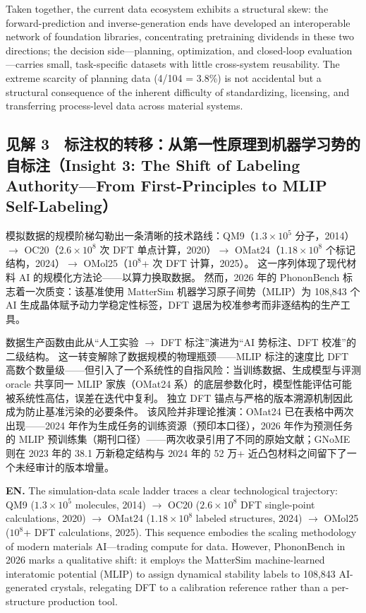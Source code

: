 \documentclass[11pt,a4paper]{ctexart}
\begin{document}
Taken together, the current data ecosystem exhibits a structural skew: the forward-prediction and inverse-generation ends have developed an interoperable network of foundation libraries, concentrating pretraining dividends in these two directions; the decision side---planning, optimization, and closed-loop evaluation---carries small, task-specific datasets with little cross-system reusability. The extreme scarcity of planning data (4/104 = 3.8\%) is not accidental but a structural consequence of the inherent difficulty of standardizing, licensing, and transferring process-level data across material systems.

\subsection*{见解 3　标注权的转移：从第一性原理到机器学习势的自标注（Insight 3: The Shift of Labeling Authority---From First-Principles to MLIP Self-Labeling）}

模拟数据的规模阶梯勾勒出一条清晰的技术路线：QM9（$1.3\times10^5$ 分子，2014）$\to$ OC20（$2.6\times10^8$ 次 DFT 单点计算，2020）$\to$ OMat24（$1.18\times10^8$ 个标记结构，2024）$\to$ OMol25（$10^8$+ 次 DFT 计算，2025）。
这一序列体现了现代材料 AI 的规模化方法论——以算力换取数据。
然而，2026 年的 PhononBench 标志着一次质变：该基准使用 MatterSim 机器学习原子间势（MLIP）为 108,843 个 AI 生成晶体赋予动力学稳定性标签，DFT 退居为校准参考而非逐结构的生产工具。

数据生产函数由此从``人工实验 $\to$ DFT 标注''演进为``AI 势标注、DFT 校准''的二级结构。
这一转变解除了数据规模的物理瓶颈——MLIP 标注的速度比 DFT 高数个数量级——但引入了一个系统性的自指风险：当训练数据、生成模型与评测 oracle 共享同一 MLIP 家族（OMat24 系）的底层参数化时，模型性能评估可能被系统性高估，误差在迭代中复利。
独立 DFT 锚点与严格的版本溯源机制因此成为防止基准污染的必要条件。
该风险并非理论推演：OMat24 已在表格中两次出现——2024 年作为生成任务的训练资源（预印本口径），2026 年作为预测任务的 MLIP 预训练集（期刊口径）——两次收录引用了不同的原始文献；GNoME 则在 2023 年的 38.1 万新稳定结构与 2024 年的 52 万+ 近凸包材料之间留下了一个未经审计的版本增量。

\textbf{EN.} The simulation-data scale ladder traces a clear technological trajectory: QM9 ($1.3\times10^5$ molecules, 2014) $\to$ OC20 ($2.6\times10^8$ DFT single-point calculations, 2020) $\to$ OMat24 ($1.18\times10^8$ labeled structures, 2024) $\to$ OMol25 ($10^8$+ DFT calculations, 2025). This sequence embodies the scaling methodology of modern materials AI---trading compute for data. However, PhononBench in 2026 marks a qualitative shift: it employs the MatterSim machine-learned interatomic potential (MLIP) to assign dynamical stability labels to 108,843 AI-generated crystals, relegating DFT to a calibration reference rather than a per-structure production tool.
\end{document}
